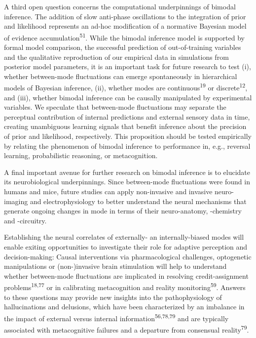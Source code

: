 \documentclass[
]{article}
\begin{document}
A third open question concerns the computational underpinnings of
bimodal inference. The addition of slow anti-phase oscillations to the
integration of prior and likelihood represents an ad-hoc modification of
a normative Bayesian model of evidence accumulation\textsuperscript{51}.
While the bimodal inference model is supported by formal model
comparison, the successful prediction of out-of-training variables and
the qualitative reproduction of our empirical data in simulations from
posterior model parameters, it is an important task for future research
to test (i), whether between-mode fluctuations can emerge spontaneously
in hierarchical models of Bayesian inference, (ii), whether modes are
continuous\textsuperscript{19} or discrete\textsuperscript{12}, and
(iii), whether bimodal inference can be causally manipulated by
experimental variables. We speculate that between-mode fluctuations may
separate the perceptual contribution of internal predictions and
external sensory data in time, creating unambiguous learning signals
that benefit inference about the precision of prior and likelihood,
respectively. This proposition should be tested empirically by relating
the phenomenon of bimodal inference to performance in, e.g., reversal
learning, probabilistic reasoning, or metacognition.

A final important avenue for further research on bimodal inference is to
elucidate its neurobiological underpinnings. Since between-mode
fluctuations were found in humans and mice, future studies can apply
non-invasive and invasive neuro-imaging and electrophysiology to better
understand the neural mechanisms that generate ongoing changes in mode
in terms of their neuro-anatomy, -chemistry and -circuitry.

Establishing the neural correlates of externally- an internally-biased
modes will enable exiting opportunities to investigate their role for
adaptive perception and decision-making: Causal interventions via
pharmacological challenges, optogenetic manipulations or (non-)invasive
brain stimulation will help to understand whether between-mode
fluctuations are implicated in resolving credit-assignment
problems\textsuperscript{18,77} or in calibrating metacognition and
reality monitoring\textsuperscript{59}. Answers to these questions may
provide new insights into the pathophysiology of hallucinations and
delusions, which have been characterized by an imbalance in the impact
of external versus internal information\textsuperscript{56,78,79} and
are typically associated with metacognitive failures and a departure
from consensual reality\textsuperscript{79}.
\end{document}
